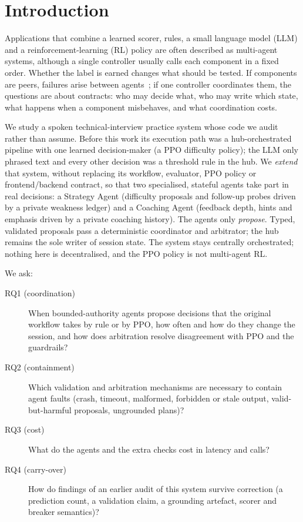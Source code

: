 \section{Introduction}\label{sec:intro}
Applications that combine a learned scorer, rules, a small language model (LLM) and a reinforcement-learning (RL) policy are often described as multi-agent systems, although a single controller usually calls each component in a fixed order. Whether the label is earned changes what should be tested. If components are peers, failures arise between agents~\cite{mast}; if one controller coordinates them, the questions are about contracts: who may decide what, who may write which state, what happens when a component misbehaves, and what coordination costs.

We study a spoken technical-interview practice system whose code we audit rather than assume. Before this work its execution path was a hub-orchestrated pipeline with one learned decision-maker (a PPO difficulty policy); the LLM only phrased text and every other decision was a threshold rule in the hub. We \emph{extend} that system, without replacing its workflow, evaluator, PPO policy or frontend/backend contract, so that two specialised, stateful agents take part in real decisions: a Strategy Agent (difficulty proposals and follow-up probes driven by a private weakness ledger) and a Coaching Agent (feedback depth, hints and emphasis driven by a private coaching history). The agents only \emph{propose}. Typed, validated proposals pass a deterministic coordinator and arbitrator; the hub remains the sole writer of session state. The system stays centrally orchestrated; nothing here is decentralised, and the PPO policy is not multi-agent RL.

We ask:
\begin{description}
\item[RQ1 (coordination)] When bounded-authority agents propose decisions that the original workflow takes by rule or by PPO, how often and how do they change the session, and how does arbitration resolve disagreement with PPO and the guardrails?
\item[RQ2 (containment)] Which validation and arbitration mechanisms are necessary to contain agent faults (crash, timeout, malformed, forbidden or stale output, valid-but-harmful proposals, ungrounded plans)?
\item[RQ3 (cost)] What do the agents and the extra checks cost in latency and calls?
\item[RQ4 (carry-over)] How do findings of an earlier audit of this system survive correction (a prediction count, a validation claim, a grounding artefact, scorer and breaker semantics)?
\end{description}


